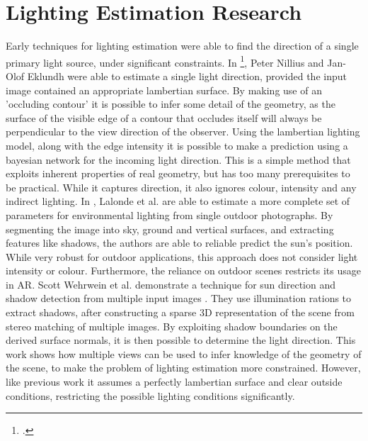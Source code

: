 \documentclass[ %
                    author={Gavin Parker},
                supervisor={Dr. Neill Campbell},
                    degree={MEng},
                     title={Deep Siamese Networks for Illumination Estimation from Stereo Images},
                  subtitle={},
                      type={research},
                      year={2018} ]{dissertation}
\begin{document}
\section{Lighting Estimation Research}
Early techniques for lighting estimation were able to find the direction of a single primary light source, under significant constraints. In \footcite{http://ieeexplore.ieee.org/stamp/stamp.jsp?tp=&arnumber=990650}, Peter Nillius and Jan-Olof Eklundh were able to estimate a single light direction, provided the input image contained an appropriate lambertian surface. By making use of an 'occluding contour' it is possible to infer some detail of the geometry, as the surface of the visible edge of a contour that occludes itself will always be perpendicular to the view direction of the observer. Using the lambertian lighting model, along with the edge intensity it is possible to make a prediction using a bayesian network for the incoming light direction. This is a simple method that exploits inherent properties of real geometry, but has too many prerequisites to be practical. While it captures direction, it also ignores colour, intensity and any indirect lighting. 
In \cite{Lalonde-2009-10350}, Lalonde et al. are able to estimate a more complete set of parameters for environmental lighting from single outdoor photographs. By segmenting the image into sky, ground and vertical surfaces, and extracting features like shadows, the authors are able to reliable predict the sun's position. While very robust for outdoor applications, this approach does not consider light intensity or colour. Furthermore, the reliance on outdoor scenes restricts its usage in AR.
Scott Wehrwein et al. demonstrate a technique for sun direction and shadow detection from multiple input images \cite{http://www.cs.cornell.edu/projects/shadows/files/wehrwein_3dv15_shadows.pdf}. They use illumination rations to extract shadows, after constructing a sparse 3D representation of the scene from stereo matching of multiple images. By exploiting shadow boundaries on the derived surface normals, it is then possible to determine the light direction. This work shows how multiple views can be used to infer knowledge of the geometry of the scene, to make the problem of lighting estimation more constrained. However, like previous work it assumes a perfectly lambertian surface and clear outside conditions, restricting the possible lighting conditions significantly.
\newline
\end{document}
